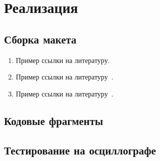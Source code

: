 \chapter{Реализация}
\section{Сборка макета}
\begin{enumerate}
\item Пример ссылки на литературу.
\item Пример ссылки на литературу~\cite{wikiRUIdSoftware}.
\item Пример ссылки на литературу~\cite{wikiRUGitHub}.
\end{enumerate}
\section{Кодовые фрагменты}

\section{Тестирование на осциллографе}